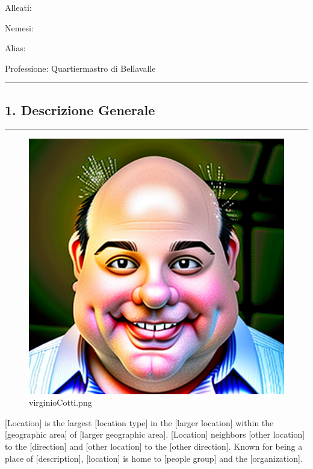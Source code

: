 Alleati:

Nemesi:

Alias:

Professione: Quartiermastro di Bellavalle

\begin{center}\rule{0.5\linewidth}{0.5pt}\end{center}

\subsection{1. Descrizione Generale}\label{descrizione-generale}

\begin{center}\rule{0.5\linewidth}{0.5pt}\end{center}

\begin{figure}
\centering
\includegraphics{virginioCotti.png}
\caption{virginioCotti.png}
\end{figure}

{[}Location{]} is the largest {[}location type{]} in the {[}larger
location{]} within the {[}geographic area{]} of {[}larger geographic
area{]}. {[}Location{]} neighbors {[}other location{]} to the
{[}direction{]} and {[}other location{]} to the {[}other direction{]}.
Known for being a place of {[}description{]}, {[}location{]} is home to
{[}people group{]} and the {[}organization{]}.

